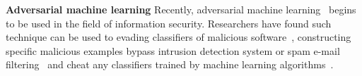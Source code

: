 \noindent \textbf{Adversarial machine learning} Recently, adversarial machine learning~\cite{Huang2011Adversarial} begins to be used in the field of information security. Researchers have found such technique can be used to evading classifiers of malicious software~\cite{Xu2016Automatically, Rosenberg2017Generic}, constructing specific malicious examples bypass intrusion detection system or spam e-mail filtering~\cite{Barreno2006Can} and cheat any classifiers trained by machine learning algorithms~\cite{Goodfellow2015Explaining, Miyato2015Distributional}.


%
%
